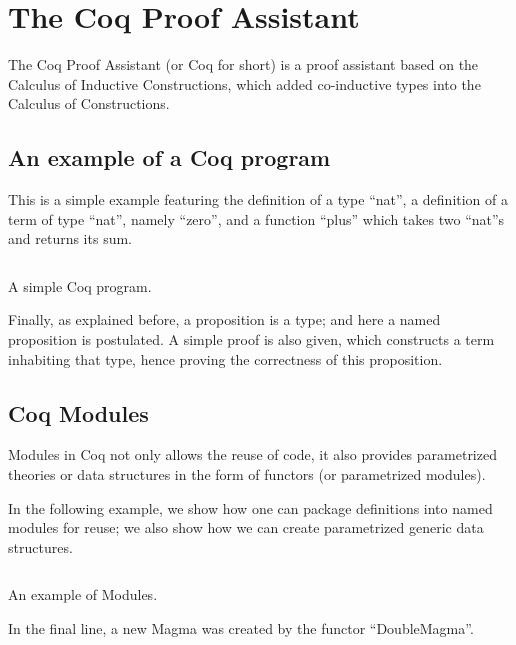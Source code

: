 \chapter{The Coq Proof Assistant}

The Coq Proof Assistant (or Coq for short) is a proof assistant 
based on the Calculus of Inductive Constructions, which added
co-inductive types into the Calculus of Constructions.

\section{An example of a Coq program} This is a simple example featuring the
definition of a type ``nat'', a definition of a term of type ``nat'', namely
``zero'', and a function ``plus''  which takes two ``nat''s and returns its sum.

\begin{listing}[!ht]
\inputminted{coq}{code/example.v}
\caption{A simple Coq program.}
\end{listing}

Finally, as explained before, a proposition is a type; and here a named
proposition is postulated. A simple proof is also given, which constructs a term
inhabiting that type, hence proving the correctness of this proposition.

\section{Coq Modules}
Modules in Coq not only allows the reuse of code, it also provides parametrized
theories or data structures in the form of functors (or parametrized modules).

In the following example, we show how one can package definitions into named modules
for reuse; we also show how we can create parametrized generic data structures.

\begin{listing}[!ht]
\inputminted{coq}{code/module_example.v}
\caption{An example of Modules.}
\end{listing}

In the final line, a new Magma was created by the functor ``DoubleMagma''.